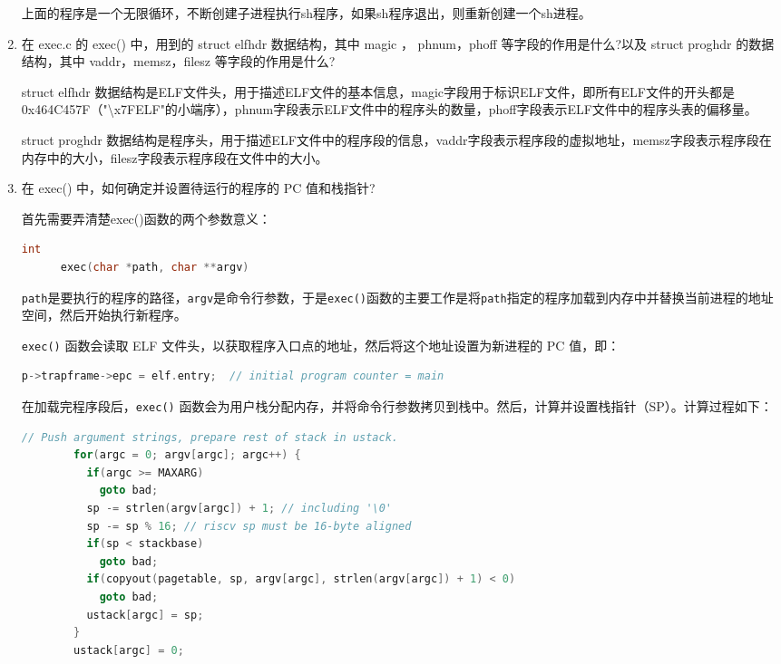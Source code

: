 \documentclass[UTF8]{article}
\begin{document}
\begin{enumerate}
    上面的程序是一个无限循环，不断创建子进程执行sh程序，如果sh程序退出，则重新创建一个sh进程。

    \item 在 exec.c 的 exec() 中，用到的 struct elfhdr 数据结构，其中 magic ， phnum，phoff 等字段的作用是什么?以及 struct proghdr 的数据结构，其中 vaddr，memsz，filesz 等字段的作用是什么?
    
    struct elfhdr 数据结构是ELF文件头，用于描述ELF文件的基本信息，magic字段用于标识ELF文件，即所有ELF文件的开头都是0x464C457F（"\textbackslash x7FELF"的小端序），phnum字段表示ELF文件中的程序头的数量，phoff字段表示ELF文件中的程序头表的偏移量。

    struct proghdr 数据结构是程序头，用于描述ELF文件中的程序段的信息，vaddr字段表示程序段的虚拟地址，memsz字段表示程序段在内存中的大小，filesz字段表示程序段在文件中的大小。

    \item 在 exec() 中，如何确定并设置待运行的程序的 PC 值和栈指针?
    
    首先需要弄清楚exec()函数的两个参数意义：

    \begin{lstlisting}[language=C]
      int
      exec(char *path, char **argv)
    \end{lstlisting}
    
    \texttt{path}是要执行的程序的路径，\texttt{argv}是命令行参数，于是\texttt{exec()}函数的主要工作是将\texttt{path}指定的程序加载到内存中并替换当前进程的地址空间，然后开始执行新程序。
    
    \texttt{exec()} 函数会读取 ELF 文件头，以获取程序入口点的地址，然后将这个地址设置为新进程的 PC 值，即：

    \begin{lstlisting}[language=C]
      p->trapframe->epc = elf.entry;  // initial program counter = main
    \end{lstlisting}

    在加载完程序段后，\texttt{exec()} 函数会为用户栈分配内存，并将命令行参数拷贝到栈中。然后，计算并设置栈指针（SP）。计算过程如下：

    \begin{lstlisting}[language=C]
        // Push argument strings, prepare rest of stack in ustack.
        for(argc = 0; argv[argc]; argc++) {
          if(argc >= MAXARG)
            goto bad;
          sp -= strlen(argv[argc]) + 1; // including '\0'
          sp -= sp % 16; // riscv sp must be 16-byte aligned
          if(sp < stackbase)
            goto bad;
          if(copyout(pagetable, sp, argv[argc], strlen(argv[argc]) + 1) < 0)
            goto bad;
          ustack[argc] = sp;
        }
        ustack[argc] = 0;
        

\end{lstlisting}
\end{enumerate}
\end{document}
